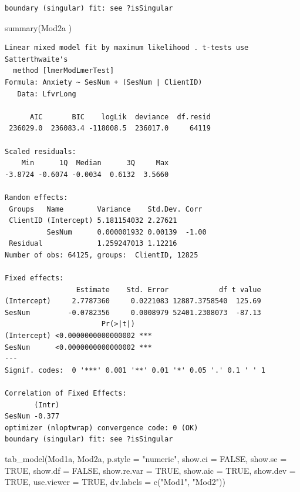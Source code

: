 \documentclass[
  english,
]{book}
\newenvironment{Shaded}{\begin{snugshade}}{\end{snugshade}}
\newcommand{\AttributeTok}[1]{\textcolor[rgb]{0.77,0.63,0.00}{#1}}
\newcommand{\ConstantTok}[1]{\textcolor[rgb]{0.00,0.00,0.00}{#1}}
\newcommand{\FunctionTok}[1]{\textcolor[rgb]{0.00,0.00,0.00}{#1}}
\newcommand{\NormalTok}[1]{#1}
\newcommand{\StringTok}[1]{\textcolor[rgb]{0.31,0.60,0.02}{#1}}
\begin{document}
\begin{verbatim}
boundary (singular) fit: see ?isSingular
\end{verbatim}

\begin{Shaded}
\begin{Highlighting}[]
\FunctionTok{summary}\NormalTok{(Mod2a )}
\end{Highlighting}
\end{Shaded}

\begin{verbatim}
Linear mixed model fit by maximum likelihood . t-tests use Satterthwaite's
  method [lmerModLmerTest]
Formula: Anxiety ~ SesNum + (SesNum | ClientID)
   Data: LfvrLong

      AIC       BIC    logLik  deviance  df.resid 
 236029.0  236083.4 -118008.5  236017.0     64119 

Scaled residuals: 
    Min      1Q  Median      3Q     Max 
-3.8724 -0.6074 -0.0034  0.6132  3.5660 

Random effects:
 Groups   Name        Variance    Std.Dev. Corr 
 ClientID (Intercept) 5.181154032 2.27621       
          SesNum      0.000001932 0.00139  -1.00
 Residual             1.259247013 1.12216       
Number of obs: 64125, groups:  ClientID, 12825

Fixed effects:
                 Estimate    Std. Error            df t value
(Intercept)     2.7787360     0.0221083 12887.3758540  125.69
SesNum         -0.0782356     0.0008979 52401.2308073  -87.13
                       Pr(>|t|)    
(Intercept) <0.0000000000000002 ***
SesNum      <0.0000000000000002 ***
---
Signif. codes:  0 '***' 0.001 '**' 0.01 '*' 0.05 '.' 0.1 ' ' 1

Correlation of Fixed Effects:
       (Intr)
SesNum -0.377
optimizer (nloptwrap) convergence code: 0 (OK)
boundary (singular) fit: see ?isSingular
\end{verbatim}

\begin{Shaded}
\begin{Highlighting}[]
\FunctionTok{tab\_model}\NormalTok{(Mod1a, Mod2a, }\AttributeTok{p.style =} \StringTok{"numeric"}\NormalTok{, }\AttributeTok{show.ci =} \ConstantTok{FALSE}\NormalTok{, }\AttributeTok{show.se =} \ConstantTok{TRUE}\NormalTok{, }\AttributeTok{show.df =} \ConstantTok{FALSE}\NormalTok{, }\AttributeTok{show.re.var =} \ConstantTok{TRUE}\NormalTok{, }\AttributeTok{show.aic =} \ConstantTok{TRUE}\NormalTok{, }\AttributeTok{show.dev =} \ConstantTok{TRUE}\NormalTok{, }\AttributeTok{use.viewer =} \ConstantTok{TRUE}\NormalTok{, }\AttributeTok{dv.labels =} \FunctionTok{c}\NormalTok{(}\StringTok{"Mod1"}\NormalTok{, }\StringTok{"Mod2"}\NormalTok{))}
\end{Highlighting}
\end{Shaded}
\end{document}
